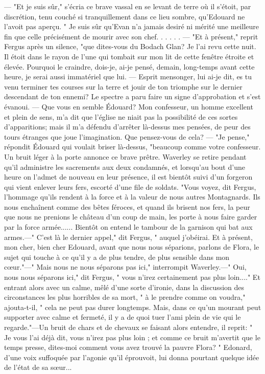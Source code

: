 — "Et je suis sûr," s'écria ce brave vassal en se levant de terre où il s'étoit, par discrétion, tenu couché si tranquillement dans ce lieu sombre, qu'Edouard ne l'avoit pas aperçu. " Je suis sûr qu'Evan n'a jamais desiré ni mérité une meilleure fin que celle précisément de mourir avec son chef. . . . . .
— "Et à présent," reprit Fergus après un silence, "que dites-vous du Bodach Glan? Je l'ai revu cette nuit. Il étoit dans le rayon\setcounter{page}{387} de l'une qui tombait sur mon lit de cette fenêtre étroite et élevée. Pourquoi le craindre, dois-je, ai-je pensé, demain, long-temps avant cette heure, je serai aussi immatériel que lui. — Esprit mensonger, lui ai-je dit, es tu venu terminer tes courses sur la terre et jouir de ton triomphe sur le dernier descendant de ton ennemi? Le spectre a paru faire un signe d'approbation et s'est évanoui.
— Que vous en semble Édouard? Mon confesseur, un homme excellent et plein de sens, m'a dit que l'église ne niait pas la possibilité de ces sortes d'apparitions; mais il m'a défendu d'arrêter là-dessus mes pensées, de peur des tours étranges que joue l'imagination. Que pensez-vous de cela?
— "Je pense," répondit Édouard qui voulait briser là-dessus, "beaucoup comme votre confesseur. Un bruit léger à la porte annonce ce brave prêtre. Waverley se retire pendant qu'il administre les sacrements aux deux condamnés, et lorsqu'au bout d'une heure on l'admet de nouveau en leur présence, il est bientôt suivi d'un forgeron qui vient enlever leurs fers, escorté d'une file de soldats.
"Vous voyez, dit Fergus, l'hommage qu'ils rendent à la force et à la valeur de nous\setcounter{page}{388} autres Montagnards. Ils nous enchaînent comme des bêtes féroces, et quand ils brisent nos fers, la peur que nous ne prenions le château d'un coup de main, les porte à nous faire garder par la force armée...... Bientôt on entend le tambour de la garnison qui bat aux armes.—" C'est là le dernier appel," dit Fergus, " auquel j'obéirai. Et à présent, mon cher, bien cher Edouard, avant que nous nous séparions, parlons de Flora, le sujet qui touche à ce qu'il y a de plus tendre, de plus sensible dans mon cœur."—" Mais nous ne nous séparons pas ici," interrompit Waverley.—" Oui, nous nous séparons ici," dit Fergus, " vous n'irez certainement pas plus loin...." Et entrant alors avec un calme, mêlé d'une sorte d'ironie, dans la discussion des circonstances les plus horribles de sa mort, " à le prendre comme on voudra," ajouta-t-il, " cela ne peut pas durer longtemps. Mais, dans ce qu'un mourant peut supporter avec calme et fermeté, il y a de quoi tuer l'ami plein de vie qui le regarde."—Un bruit de chars et de chevaux se faisant alors entendre, il reprit: " Je vous l'ai déjà dit, vous n'irez pas plus loin ; et comme ce bruit m'avertit que le temps presse, dites-moi comment vous avez trouvé la pauvre Flora? "\setcounter{page}{389} Edonard, d'une voix suffoquée par l'agonie qu'il éprouvoit, lui donna pourtant quelque idée de l'état de sa sœur...
